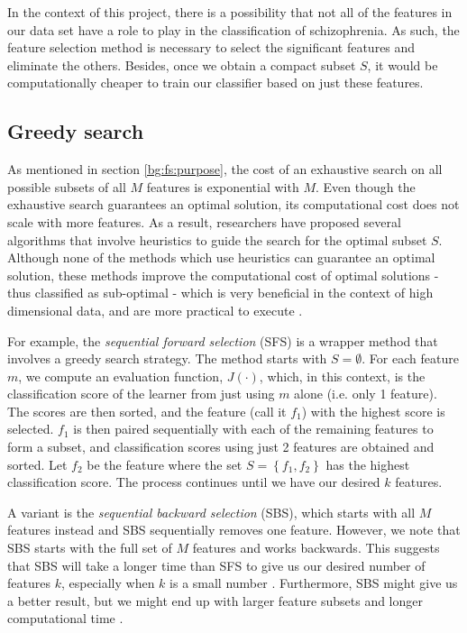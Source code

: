 \documentclass[12pt, twoside, a4paper]{report}
\begin{document}
In the context of this project, there is a possibility that not all of the features in our data set have a role to play in the classification of schizophrenia. As such, the feature selection method is necessary to select the significant features and eliminate the others. Besides, once we obtain a compact subset $S$, it would be computationally cheaper to train our classifier based on just these features.


\subsection{Greedy search} \label{bg:fs:greedy}
As mentioned in section \ref{bg:fs:purpose}, the cost of an exhaustive search on all possible subsets of all $M$ features is exponential with $M$. Even though the exhaustive search guarantees an optimal solution, its computational cost does not scale with more features. As a result, researchers have proposed several algorithms that involve heuristics to guide the search for the optimal subset $S$. Although none of the methods which use heuristics can guarantee an optimal solution, these methods improve the computational cost of optimal solutions - thus classified as sub-optimal - which is very beneficial in the context of high dimensional data, and are more practical to execute \cite{RefWorks:140, RefWorks:182}.

For example, the \textit{sequential forward selection} (SFS) \cite{RefWorks:177} is a wrapper method that involves a greedy search strategy. The method starts with $S=\emptyset$. For each feature $m$, we compute an evaluation function, $J(\cdot)$, which, in this context, is the classification score of the learner from just using $m$ alone (i.e. only 1 feature). The scores are then sorted, and the feature (call it $f_1$) with the highest score is selected. $f_1$ is then paired sequentially with each of the remaining features to form a subset, and classification scores using just 2 features are obtained and sorted. Let $f_2$ be the feature where the set $S= \left\lbrace f_1, f_2 \right\rbrace$ has the highest classification score. The process continues until we have our desired $k$ features.
  
A variant is the \textit{sequential backward selection} (SBS), which starts with all $M$ features instead and SBS sequentially removes one feature. However, we note that SBS starts with the full set of $M$ features and works backwards. This suggests that SBS will take a longer time than SFS to give us our desired number of features $k$, especially when $k$ is a small number \cite{RefWorks:190}. Furthermore, SBS might give us a better result, but we might end up with larger feature subsets and longer computational time \cite{RefWorks:208}.
\end{document}
